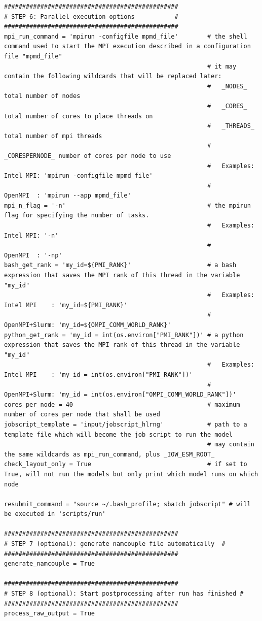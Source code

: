 \documentclass[a4paper,titlepage]{scrartcl}
\begin{document}
\begin{verbatim}
################################################
# STEP 6: Parallel execution options           #
################################################
mpi_run_command = 'mpirun -configfile mpmd_file'        # the shell command used to start the MPI execution described in a configuration file "mpmd_file"
                                                        # it may contain the following wildcards that will be replaced later:
                                                        #   _NODES_ total number of nodes
                                                        #   _CORES_ total number of cores to place threads on
                                                        #   _THREADS_ total number of mpi threads
                                                        #   _CORESPERNODE_ number of cores per node to use
                                                        #   Examples: Intel MPI: 'mpirun -configfile mpmd_file'
                                                        #             OpenMPI  : 'mpirun --app mpmd_file'
mpi_n_flag = '-n'                                       # the mpirun flag for specifying the number of tasks.
                                                        #   Examples: Intel MPI: '-n'
                                                        #             OpenMPI  : '-np'
bash_get_rank = 'my_id=${PMI_RANK}'                     # a bash expression that saves the MPI rank of this thread in the variable "my_id"
                                                        #   Examples: Intel MPI    : 'my_id=${PMI_RANK}'
                                                        #             OpenMPI+Slurm: 'my_id=${OMPI_COMM_WORLD_RANK}'
python_get_rank = 'my_id = int(os.environ["PMI_RANK"])' # a python expression that saves the MPI rank of this thread in the variable "my_id"
                                                        #   Examples: Intel MPI    : 'my_id = int(os.environ["PMI_RANK"])'
                                                        #             OpenMPI+Slurm: 'my_id = int(os.environ["OMPI_COMM_WORLD_RANK"])'
cores_per_node = 40                                     # maximum number of cores per node that shall be used
jobscript_template = 'input/jobscript_hlrng'            # path to a template file which will become the job script to run the model
                                                        # may contain the same wildcards as mpi_run_command, plus _IOW_ESM_ROOT_
check_layout_only = True                                # if set to True, will not run the models but only print which model runs on which node

resubmit_command = "source ~/.bash_profile; sbatch jobscript" # will be executed in 'scripts/run'

################################################
# STEP 7 (optional): generate namcouple file automatically  #
################################################
generate_namcouple = True

################################################
# STEP 8 (optional): Start postprocessing after run has finished #
################################################
process_raw_output = True
\end{verbatim}
\end{document}
